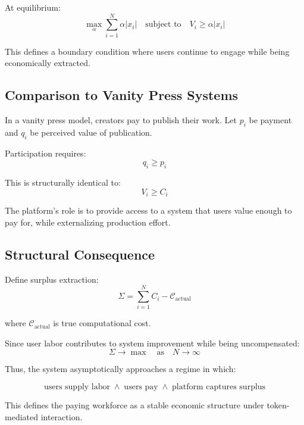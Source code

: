 \documentclass[12pt, oneside]{article}
\begin{document}
At equilibrium:
\[
\max_\alpha \sum_{i=1}^N \alpha |x_i| \quad \text{subject to} \quad V_i \geq \alpha |x_i|
\]

This defines a boundary condition where users continue to engage while being economically extracted.

\subsection{Comparison to Vanity Press Systems}

In a vanity press model, creators pay to publish their work. Let $p_i$ be payment and $q_i$ be perceived value of publication.

Participation requires:
\[
q_i \geq p_i
\]

This is structurally identical to:
\[
V_i \geq C_i
\]

The platform's role is to provide access to a system that users value enough to pay for, while externalizing production effort.

\subsection{Structural Consequence}

Define surplus extraction:
\[
\Sigma = \sum_{i=1}^N C_i - \mathcal{C}_{\text{actual}}
\]

where $\mathcal{C}_{\text{actual}}$ is true computational cost.

Since user labor contributes to system improvement while being uncompensated:
\[
\Sigma \to \max \quad \text{as} \quad N \to \infty
\]

Thus, the system asymptotically approaches a regime in which:

\[
\text{users supply labor} \;\land\; \text{users pay} \;\land\; \text{platform captures surplus}
\]

This defines the paying workforce as a stable economic structure under token-mediated interaction.
\end{document}
